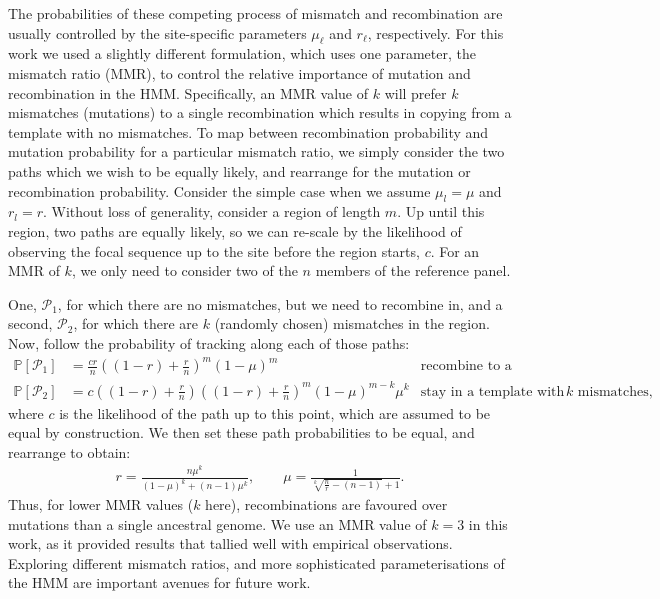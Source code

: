 \documentclass{article}
\begin{document}
The probabilities of these competing process of mismatch and recombination are
usually controlled by the site-specific parameters $\mu_\ell$ and $r_\ell$,
respectively. For this work we used a slightly different formulation, which
uses one parameter, the mismatch ratio (MMR), to control the relative
importance of mutation and recombination in the HMM. Specifically, an MMR value
of $k$ will prefer $k$ mismatches (mutations) to a single recombination which
results in copying from a template with no mismatches. To map between
recombination probability and mutation probability for a particular mismatch
ratio, we simply consider the two paths which we wish to be equally likely, and
rearrange for the mutation or recombination probability. Consider the simple
case when we assume $\mu_l=\mu$ and $r_l=r$. Without loss of generality,
consider a region of length $m$. Up until this region, two paths are equally
likely, so we can re-scale by the likelihood of observing the focal sequence up
to the site before the region starts, $c$. For an MMR of $k$, we only need to
consider two of the $n$ members of the reference panel.

One, $\mathcal{P}_1$,
for which there are no mismatches, but we need to recombine in, and a second,
$\mathcal{P}_2$, for which there are $k$ (randomly chosen) mismatches in the
region.
Now, follow the probability of tracking along each of those paths:
\begin{align*}
\mathbb{P}[\mathcal{P}_1] &= \frac{cr}{n}
\left(\left(1-r\right)+\frac{r}{n}\right)^m\left(1-\mu\right)^m
&\text{recombine to a template with no mismatches,}\\
\mathbb{P}[\mathcal{P}_2] &= c
\left(\left(1-r\right) +
\frac{r}{n}\right)\left(\left(1-r\right)+\frac{r}{n}\right)^m
\left(1-\mu\right)^{m-k}\mu^k &\text{stay in a template with $k$ mismatches,}
\end{align*}
where $c$ is the
likelihood of the path up to this point, which are assumed to be
equal by construction.
We then
set these path probabilities to be equal, and rearrange to obtain:
\begin{align*} r = \frac{n\mu^k}{\left(1-\mu\right)^k + \left(n-1\right)\mu^k},
\quad\quad \mu = \frac{1}{\sqrt[k]{\frac{n}{r} - (n-1)} + 1}. \end{align*}
Thus, for lower MMR values ($k$ here),
recombinations are favoured over mutations
than a single ancestral genome. We use an MMR value of $k=3$ in this work,
as it provided results that tallied well with empirical observations.
Exploring different mismatch ratios, and more sophisticated parameterisations
of the HMM are important avenues for future work.
\end{document}
